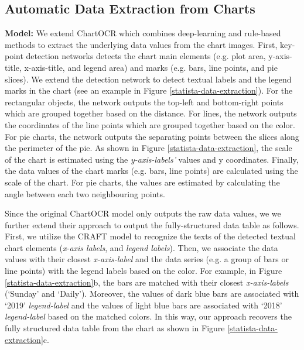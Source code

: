 \subsection{Automatic Data Extraction from Charts}
\label{app:data_extraction}

\textbf{Model:} We extend ChartOCR \cite{ChartOCR} which combines deep-learning and rule-based methods to extract the underlying data values from the chart images. First, key-point detection networks detects the chart main elements (e.g. plot area, y-axis-title, x-axis-title, and legend area) and marks (e.g. bars, line points, and pie slices). We extend the detection network to detect textual labels and the legend marks in the chart (see an example in Figure \ref{statista-data-extraction}). For the rectangular objects, the network outputs the top-left and bottom-right points which are grouped together based on the distance. For lines, the network outputs the coordinates of the line points which are grouped together based on the color. For pie charts, the network outputs the separating points between the slices along the perimeter of the pie. As shown in Figure \ref{statista-data-extraction}, the scale of the chart  is estimated using the \textit{y-axis-labels'} values and y coordinates. Finally, the data values of the chart marks (e.g. bars, line points) are calculated using the scale of the chart. For pie charts, the values are estimated by calculating the angle between each two neighbouring points. 

Since the original ChartOCR model only outputs the raw data values, we we further extend their approach to output the fully-structured data table as follows. First, we utilize the CRAFT model \cite{craftrecognition} to recognize the texts of the detected textual chart elements (\textit{x-axis labels}, and \textit{legend labels}). Then, we associate the data values with their closest \textit{x-axis-label} and the data series (e.g. a group of bars or line points) with the legend labels based on the color. For example, in Figure \ref{statista-data-extraction}b, the bars are matched with their closest \textit{x-axis-labels} (`Sunday' and `Daily'). Moreover, the values of dark blue bars are associated with `2019' \textit{legend-label} and the values of light blue bars are associated with `2018' \textit{legend-label} based on the matched colors. In this way, our approach recovers the fully structured data table from the chart as shown in Figure \ref{statista-data-extraction}c.

